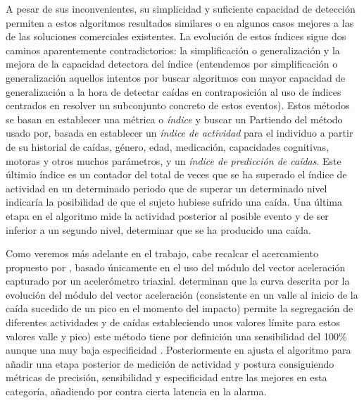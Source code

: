 A pesar de sus inconvenientes, su simplicidad y suficiente capacidad de detección permiten a estos algoritmos resultados similares o en algunos casos mejores a las de las soluciones comerciales existentes\cite{Kangas2008}. La evolución de estos índices sigue dos caminos aparentemente contradictorios: la simplificación o generalización y la mejora de la capacidad detectora del índice (entendemos por simplificación o generalización aquellos intentos por buscar algoritmos con mayor capacidad de generalización a la hora de detectar caídas en contraposición al uso de índices centrados en resolver un subconjunto concreto de estos eventos). Estos métodos se basan en establecer una métrica o \textit{índice} y buscar un  Partiendo del método usado por, basada en establecer un \textit{índice de actividad} para el individuo a partir de su historial de caídas, género, edad, medicación, capacidades cognitivas, motoras y otros muchos parámetros, y un \textit{índice de predicción de caídas}. Este últimio índice es un contador del total de veces que se ha superado el índice de actividad en un determinado periodo que de superar un determinado nivel indicaría la posibilidad de que el sujeto hubiese sufrido una caída. Una última etapa en el algoritmo mide la actividad posterior al posible evento y de ser inferior a un segundo nivel, determinar que se ha producido una caída. 

Como veremos más adelante en el trabajo, cabe recalcar el acercamiento propuesto por , basado únicamente en el uso del módulo del vector aceleración capturado por un acelerómetro triaxial.  determinan que la curva descrita por la evolución del módulo del vector aceleración (consistente en un valle al inicio de la caída sucedido de un pico en el momento del impacto) permite la segregación de diferentes actividades y de caídas estableciendo unos valores límite para estos valores valle y pico) este método tiene por definición una sensibilidad del 100\% aunque una muy baja especificidad \cite{Aziz2017,Bagala2012}. Posteriormente en  ajusta el algoritmo para añadir una etapa posterior de medición de actividad y postura consiguiendo métricas de precisión, sensibilidad y especificidad entre las mejores en esta categoría, añadiendo por contra cierta latencia en la alarma.

